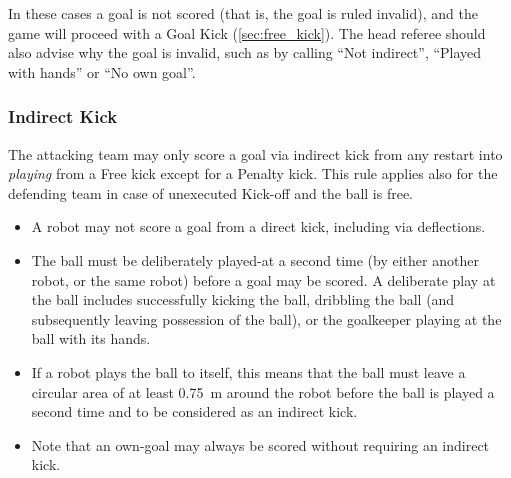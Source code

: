 In these cases a goal is not scored (that is, the goal is ruled invalid), and the game will proceed with a Goal Kick (\cf \cref{sec:free_kick}). The head referee should also advise why the goal is invalid, such as by calling ``Not indirect'', ``Played with hands'' or ``No own goal''.

\subsubsection{Indirect Kick}
\label{sec:indirect_kick}

The attacking team may only score a goal via indirect kick from any restart into \textit{playing} from a Free kick except for a Penalty kick. This rule applies also for the defending team in case of unexecuted Kick-off and the ball is free. 

\begin{itemize}
  \item A robot may not score a goal from a direct kick, including via deflections.
  \item The ball must be deliberately played-at a second time (by either another robot, or the same robot) before a goal may be scored. A deliberate play at the ball includes successfully kicking the ball, dribbling the ball (and subsequently leaving possession of the ball), or the goalkeeper playing at the ball with its hands.
  \item If a robot plays the ball to itself, this means that the ball must leave a circular area of at least \qty{0.75}{\metre} around the robot before the ball is played a second time and to be considered as an indirect kick.
  \item Note that an own-goal may always be scored without requiring an indirect kick.
\end{itemize}

